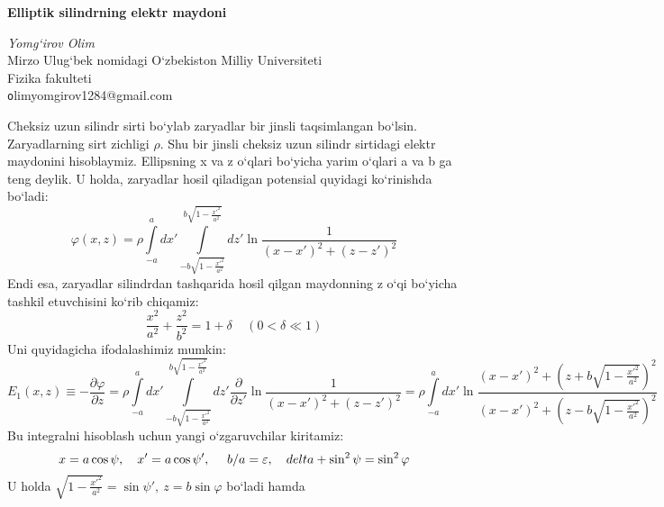\documentclass[landscape]{scrartcl}
\begin{document}
	\begin{center}
		\Large\textbf{Elliptik silindrning elektr maydoni}
		
		\textit{Yomg`irov Olim}\\
		Mirzo Ulug`bek nomidagi O`zbekiston Milliy Universiteti\\
		Fizika fakulteti\\
		\texttt olimyomgirov1284@gmail.com
	\end{center}
	\pagestyle{empty}
	\pagestyle{fancy}
	
	
	
	
	
	Cheksiz uzun silindr sirti bo`ylab zaryadlar bir jinsli taqsimlangan bo`lsin. Zaryadlarning sirt zichligi $\rho$. Shu bir jinsli cheksiz uzun silindr sirtidagi elektr maydonini hisoblaymiz.
	Ellipsning x va z o`qlari bo`yicha yarim o`qlari a va b ga teng deylik. U holda, zaryadlar hosil qiladigan potensial quyidagi ko`rinishda bo`ladi:
	\begin{equation}
	\varphi(x,z)=
	\rho\int\limits_{-a}^{a}dx'
	\int\limits_{-b\sqrt{1-\frac{x'^{2}}{a^{2}}}}^{b\sqrt{1-\frac{x'^{2}}{a^{2}}}}dz'\ln\frac{1}{(x-x')^{2}+(z-z')^{2}}
	\label{1}
	\end{equation}
	Endi esa, zaryadlar silindrdan tashqarida hosil qilgan maydonning z o`qi bo`yicha tashkil etuvchisini ko`rib chiqamiz:
	\begin{equation}
	\frac{x^{2}}{a^{2}}+\frac{z^{2}}{b^{2}}=1+\delta \ \ \ \ \ (0<\delta\ll 1)
	\label{2}
	\end{equation}
	Uni quyidagicha ifodalashimiz mumkin:
	\begin{equation}
	E_{1}(x,z)\equiv-\dfrac{\partial\varphi}{\partial z}=\rho\int\limits_{-a}^{a}dx'
	\int\limits_{-b\sqrt{1-\frac{x'^{2}}{a^{2}}}}^{b\sqrt{1-\frac{x'^{2}}{a^{2}}}}
	dz'\dfrac{\partial}{\partial z'}
	\ln{\frac{1}{(x-x')^{2}+(z-z')^{2}}}=
	\rho\int\limits_{-a}^{a}dx\prime\ln{\frac{(x-x')^{2}+
			\left(z+b\sqrt{1-\frac{x'^{2}}{a^{2}}}\right)^{2}}{(x-x')^{2}+
			\left(z-b\sqrt{1-\frac{x'^{2}}{a^{2}}}\right)^{2}}}
		\label{3}
	\end{equation}
	Bu integralni hisoblash uchun yangi o`zgaruvchilar kiritamiz:
	\begin{equation}
	x=a\cos\psi,\ \ \ \ \\ x'=a\cos\psi',\ \ \ \ b/a=\varepsilon,\ \ \ \ \\delta+\sin^{2}\psi=\sin^{2}\varphi
	\label{4} 
	\end{equation}
	U holda $\sqrt{1-\frac{x'^{2}}{a^{2}}}=\sin\psi',\ z=b\sin\varphi$ bo`ladi hamda
\end{document}
